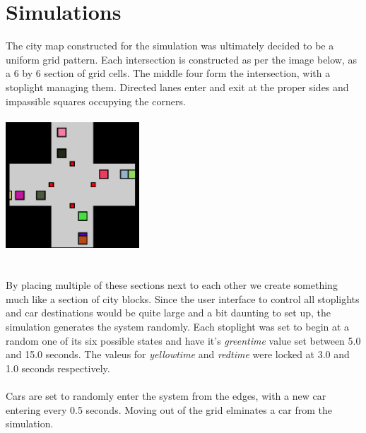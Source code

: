 \documentclass{article}
\begin{document}
\section{Simulations}

The city map constructed for the simulation was ultimately decided to be a uniform grid pattern.  Each intersection is constructed as per the image below, as a 6 by 6 section of grid cells.  The middle four form the intersection, with a stoplight managing them. Directed lanes enter and exit at the proper sides and impassible squares occupying the corners.\\

\centerline{\includegraphics[width=5cm, height=5cm]{sim_intersection}}
\hfill\\
\noindent By placing multiple of these sections next to each other we create something much like a section of city blocks.  Since the user interface to control all stoplights and car destinations would be quite large and a bit daunting to set up, the simulation generates the system randomly.  Each stoplight was set to begin at a random one of its six possible states and have it's \emph{greentime} value set between 5.0 and 15.0 seconds.  The valeus for \emph{yellowtime} and \emph{redtime} were locked at 3.0 and 1.0 seconds respectively.\\\\
Cars are set to randomly enter the system from the edges, with a new car entering every 0.5 seconds.  Moving out of the grid elminates a car from the simulation.
\end{document}
